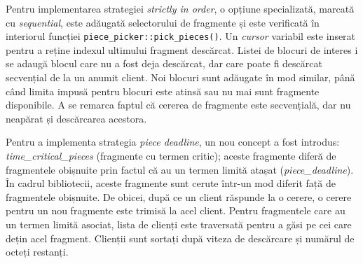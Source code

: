 Pentru implementarea strategiei \textit{strictly in order}, o opțiune
specializată, marcată cu \textit{sequential}, este adăugată selectorului de
fragmente și este verificată în interiorul funcției
\texttt{piece\_picker::pick\_pieces()}. Un \textit{cursor} variabil este
inserat pentru a reține indexul ultimului fragment descărcat. Listei de
blocuri de interes i se adaugă blocul care nu a fost deja descărcat, dar care
poate fi descărcat secvențial de la un anumit client. Noi blocuri sunt
adăugate în mod similar, până când limita impusă pentru blocuri este atinsă
sau nu mai sunt fragmente disponibile. A se remarca faptul că cererea de
fragmente este secvențială, dar nu neapărat și descărcarea acestora.

Pentru a implementa strategia \textit{piece deadline}, un nou concept a fost
introdus: \textit{time\_critical\_pieces} (fragmente cu termen critic); aceste
fragmente diferă de fragmentele obișnuite prin factul că au un termen limită
atașat (\textit{piece\_deadline}). În cadrul bibliotecii, aceste fragmente sunt
cerute într-un mod diferit față de fragmentele obișnuite. De obicei, după ce
un client răspunde la o cerere, o cerere pentru un nou fragmente este trimisă
la acel client. Pentru fragmentele care au un termen limită asociat, lista de
clienți este traversată pentru a găsi pe cei care dețin acel fragment.
Clienții sunt sortați după viteza de descărcare și numărul de octeți restanți.

